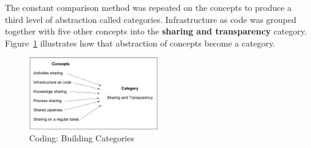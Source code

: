 The constant comparison method was repeated on the concepts to produce a third
level of abstraction called categories. Infrastructure as code was grouped
together with five other concepts into the \textbf{sharing and transparency} category.
Figure~\ref{fig1} illustrates how that abstraction of concepts become a category.


\begin{figure}
  \centering
  \includegraphics[width=0.5\textwidth]{fig1.png}
  \caption{Coding: Building Categories}
  \label{fig1}
\end{figure}
